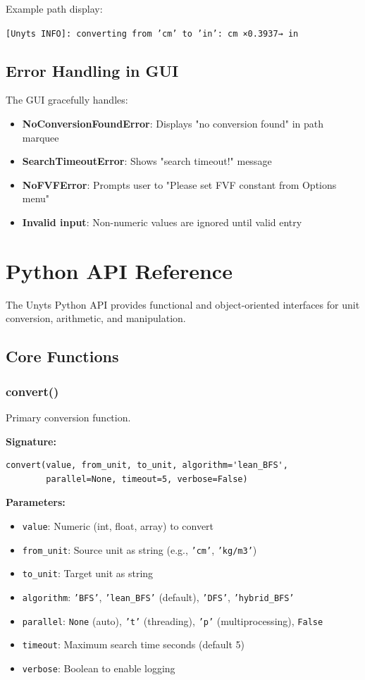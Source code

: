 \documentclass[11pt,a4paper]{report}
\begin{document}
Example path display:
\begin{center}
\texttt{[Unyts INFO]: converting from 'cm' to 'in': cm ×0.3937→ in}
\end{center}

\section{Error Handling in GUI}

The GUI gracefully handles:

\begin{itemize}
\item \textbf{NoConversionFoundError}: Displays "no conversion found" in path marquee
\item \textbf{SearchTimeoutError}: Shows "search timeout!" message
\item \textbf{NoFVFError}: Prompts user to "Please set FVF constant from Options menu"
\item \textbf{Invalid input}: Non-numeric values are ignored until valid entry
\end{itemize}


\chapter{Python API Reference}

The Unyts Python API provides functional and object-oriented interfaces for unit conversion, arithmetic, and manipulation.

\section{Core Functions}

\subsection{convert()}

Primary conversion function.

\textbf{Signature:}
\begin{lstlisting}[style=pythonstyle]
convert(value, from_unit, to_unit, algorithm='lean_BFS', 
        parallel=None, timeout=5, verbose=False)
\end{lstlisting}

\textbf{Parameters:}
\begin{itemize}
\item \texttt{value}: Numeric (int, float, array) to convert
\item \texttt{from\_unit}: Source unit as string (e.g., \texttt{'cm'}, \texttt{'kg/m3'})
\item \texttt{to\_unit}: Target unit as string
\item \texttt{algorithm}: \texttt{'BFS'}, \texttt{'lean\_BFS'} (default), \texttt{'DFS'}, \texttt{'hybrid\_BFS'}
\item \texttt{parallel}: \texttt{None} (auto), \texttt{'t'} (threading), \texttt{'p'} (multiprocessing), \texttt{False}
\item \texttt{timeout}: Maximum search time seconds (default 5)
\item \texttt{verbose}: Boolean to enable logging
\end{itemize}
\end{document}
